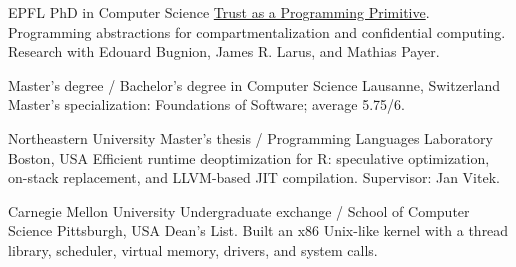 
\cventry
  {EPFL}
  {PhD in Computer Science}
  {}
  {}
  {\href{https://doi.org/10.5075/epfl-thesis-8165}{Trust as a Programming Primitive}.
   Programming abstractions for compartmentalization and confidential computing.
   Research with Edouard Bugnion, James R. Larus, and Mathias Payer.}

\cvposition
  {Master's degree / Bachelor's degree in Computer Science}
  {Lausanne, Switzerland}
  {}
  {Master's specialization: Foundations of Software; average 5.75/6.}

\cventry
  {Northeastern University}
  {Master's thesis / Programming Languages Laboratory}
  {Boston, USA}
  {}
  {Efficient runtime deoptimization for R: speculative optimization, on-stack
   replacement, and LLVM-based JIT compilation. Supervisor: Jan Vitek.}

\cventry
  {Carnegie Mellon University}
  {Undergraduate exchange / School of Computer Science}
  {Pittsburgh, USA}
  {}
  {Dean's List. Built an x86 Unix-like kernel with a thread library,
   scheduler, virtual memory, drivers, and system calls.}

